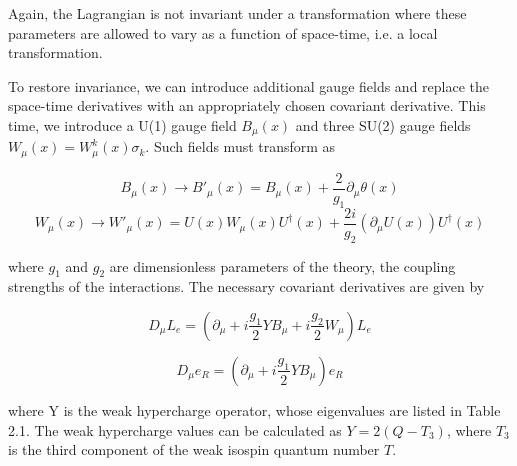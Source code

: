  Again, the Lagrangian is not invariant under a transformation where these parameters are allowed to vary as a function of space-time, i.e. a local transformation.

To restore invariance, we can introduce additional gauge fields and replace the space-time derivatives with an appropriately chosen covariant derivative. This time, we introduce a U(1) gauge field $B_{\mu}(x)$ and three SU(2) gauge fields $W_{\mu}(x)= W_{\mu}^{k}(x)\sigma_{k}$. Such fields must transform as

\begin{equation}
B_{\mu}(x)\rightarrow B'_{\mu}(x) = B_{\mu}(x) + \frac{2}{g_{1}}\partial_{\mu}\theta(x)
\end{equation}
\begin{equation}
W_{\mu}(x)\rightarrow W'_{\mu}(x) = U(x)W_{\mu}(x)U^{\dagger}(x) + \frac{2i}{g_{2}}(\partial_{\mu}U(x))U^{\dagger}(x)
\end{equation}

where $g_{1}$ and $g_{2}$ are dimensionless parameters of the theory, the coupling strengths of the interactions. The necessary covariant derivatives are given by

\begin{equation}
D_{\mu}L_{e} = (\partial_{\mu}+i\frac{g_{1}}{2}YB_{\mu}+i\frac{g_{2}}{2}W_{\mu})L_{e}
\end{equation}

\begin{equation}
D_{\mu}e_{R} = (\partial_{\mu}+i\frac{g_{1}}{2}YB_{\mu})e_{R}
\end{equation}
 
 where Y is the weak hypercharge operator, whose eigenvalues are listed in Table 2.1. The weak hypercharge values can be calculated as $Y=2(Q-T_{3})$, where $T_{3}$ is the third component of the weak isospin quantum number $T$.

